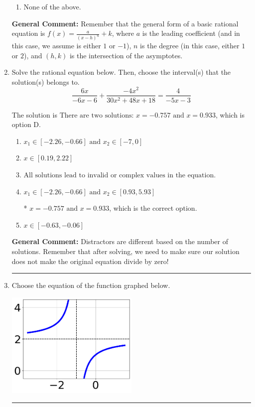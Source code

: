 \documentclass{extbook}[14pt]
\newcommand{\litem}[1]{\item #1

\rule{\textwidth}{0.4pt}}
\begin{document}
\begin{enumerate}
{\begin{enumerate}[label=\Alph*.]
\begin{multicols}{2}
\end{multicols}\item None of the above.\end{enumerate}
\textbf{General Comment:} Remember that the general form of a basic rational equation is $ f(x) = \frac{a}{(x-h)^n} + k$, where $a$ is the leading coefficient (and in this case, we assume is either $1$ or $-1$), $n$ is the degree (in this case, either $1$ or $2$), and $(h, k)$ is the intersection of the asymptotes.
}
\litem{
Solve the rational equation below. Then, choose the interval(s) that the solution(s) belongs to.
\[ \frac{6x}{-6x -6} + \frac{-4x^{2}}{30x^{2} +48 x + 18} = \frac{4}{-5x -3} \]

The solution is \( \text{There are two solutions: } x = -0.757 \text{ and } x = 0.933 \), which is option D.\begin{enumerate}[label=\Alph*.]
\item \( x_1 \in [-2.26, -0.66] \text{ and } x_2 \in [-7,0] \)


\item \( x \in [0.19,2.22] \)


\item \( \text{All solutions lead to invalid or complex values in the equation.} \)


\item \( x_1 \in [-2.26, -0.66] \text{ and } x_2 \in [0.93,5.93] \)

* $x = -0.757 \text{ and } x = 0.933$, which is the correct option.
\item \( x \in [-0.63,-0.06] \)


\end{enumerate}

\textbf{General Comment:} Distractors are different based on the number of solutions. Remember that after solving, we need to make sure our solution does not make the original equation divide by zero!
}
\litem{
Choose the equation of the function graphed below.

\begin{center}
    \includegraphics[width=0.5\textwidth]{../Figures/rationalGraphToEquationCopyC.png}
\end{center}




}
\end{enumerate}
\end{document}
